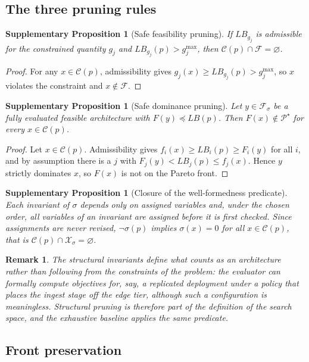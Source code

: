 \documentclass[pdflatex,sn-nature]{sn-jnl}
\newcommand{\X}{\mathcal{X}}
\newcommand{\C}{\mathcal{C}}
\newcommand{\F}{\mathcal{F}}
\newcommand{\PS}{\mathcal{P}^{\star}}
\newcommand{\LB}{\mathit{LB}}
\theoremstyle{thmstyleone}
\newtheorem{proposition}[theorem]{Supplementary Proposition}
\theoremstyle{thmstyletwo}
\newtheorem{remark}{Remark}
\theoremstyle{thmstylethree}
\begin{document}
\subsection{The three pruning rules}

\begin{proposition}[Safe feasibility pruning]\label{sprop:feas}
If $\LB_{g_j}$ is admissible for the constrained quantity $g_j$ and
$\LB_{g_j}(p)>g_j^{\max}$, then $\C(p)\cap\F=\varnothing$.
\end{proposition}
\begin{proof}
For any $x\in\C(p)$, admissibility gives $g_j(x)\ge\LB_{g_j}(p)>g_j^{\max}$, so $x$
violates the constraint and $x\notin\F$.
\end{proof}

\begin{proposition}[Safe dominance pruning]\label{sprop:dom}
Let $y\in\F_\sigma$ be a fully evaluated feasible architecture with
$F(y)\preceq\LB(p)$. Then $F(x)\notin\PS$ for every $x\in\C(p)$.
\end{proposition}
\begin{proof}
Let $x\in\C(p)$. Admissibility gives $f_i(x)\ge\LB_i(p)\ge F_i(y)$ for all $i$, and by
assumption there is a $j$ with $F_j(y)<\LB_j(p)\le f_j(x)$. Hence $y$ strictly dominates
$x$, so $F(x)$ is not on the Pareto front.
\end{proof}

\begin{proposition}[Closure of the well-formedness predicate]\label{sprop:struct}
Each invariant of $\sigma$ depends only on assigned variables and, under the chosen
order, all variables of an invariant are assigned before it is first checked. Since
assignments are never revised, $\neg\sigma(p)$ implies $\sigma(x)=0$ for all
$x\in\C(p)$, that is $\C(p)\cap\X_\sigma=\varnothing$.
\end{proposition}

\begin{remark}
The structural invariants define what counts as an architecture rather than following
from the constraints of the problem: the evaluator can formally compute objectives for,
say, a replicated deployment under a policy that places the ingest stage off the edge
tier, although such a configuration is meaningless. Structural pruning is therefore part
of the definition of the search space, and the exhaustive baseline applies the same
predicate.
\end{remark}

\subsection{Front preservation}
\end{document}
